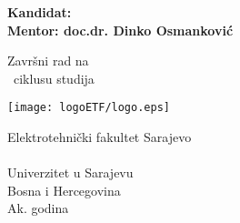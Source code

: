 
\setcounter{page}{1}

\newcommand{\sign}[1]{%
	\begin{tabular}[t]{@{}c@{}}
		\makebox[3in]{\hrulefill}\\
		\strut#1\strut
	\end{tabular}%
	\vspace{1cm}
}

\newpage

\thispagestyle{empty}
\begin{center}
  \vspace*{1cm}
  {\Huge \bf \naslovTeze}

  \vspace*{2cm}
  {\large\bf Kandidat: \imePrezime}\\
  \vspace*{1cm}
  {\large\bf Mentor: doc.dr. Dinko Osmanković}

  \vfill

  {\Large Završni rad na\\
         [1mm] \ciklus~ciklusu studija}
  \vspace*{0.9cm}
  
   \begin{center}
   \texttt{[image: logoETF/logo.eps]}
   \end{center}

  {\large Elektrotehnički fakultet Sarajevo\\
          [-3mm] \odsjek \\
          [-3mm] Univerzitet u Sarajevu\\
          [-3mm] Bosna i Hercegovina\\
          [1mm]  Ak. godina \godina}

\end{center}

